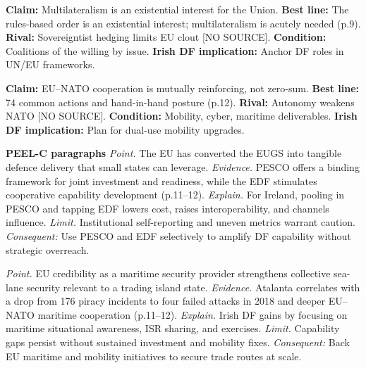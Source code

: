 \textbf{Claim:} Multilateralism is an existential interest for the Union. \textbf{Best line:} The rules-based order is an existential interest; multilateralism is acutely needed (p.9). \textbf{Rival:} Sovereigntist hedging limits EU clout [NO SOURCE]. \textbf{Condition:} Coalitions of the willing by issue. \textbf{Irish DF implication:} Anchor DF roles in UN/EU frameworks.

\textbf{Claim:} EU–NATO cooperation is mutually reinforcing, not zero-sum. \textbf{Best line:} 74 common actions and hand-in-hand posture (p.12). \textbf{Rival:} Autonomy weakens NATO [NO SOURCE]. \textbf{Condition:} Mobility, cyber, maritime deliverables. \textbf{Irish DF implication:} Plan for dual-use mobility upgrades.

\textbf{PEEL-C paragraphs}
\textit{Point.} The EU has converted the EUGS into tangible defence delivery that small states can leverage. \textit{Evidence.} PESCO offers a binding framework for joint investment and readiness, while the EDF stimulates cooperative capability development (p.11–12). \textit{Explain.} For Ireland, pooling in PESCO and tapping EDF lowers cost, raises interoperability, and channels influence. \textit{Limit.} Institutional self-reporting and uneven metrics warrant caution. \textit{Consequent:} Use PESCO and EDF selectively to amplify DF capability without strategic overreach.

\textit{Point.} EU credibility as a maritime security provider strengthens collective sea-lane security relevant to a trading island state. \textit{Evidence.} Atalanta correlates with a drop from 176 piracy incidents to four failed attacks in 2018 and deeper EU–NATO maritime cooperation (p.11–12). \textit{Explain.} Irish DF gains by focusing on maritime situational awareness, ISR sharing, and exercises. \textit{Limit.} Capability gaps persist without sustained investment and mobility fixes. \textit{Consequent:} Back EU maritime and mobility initiatives to secure trade routes at scale.


